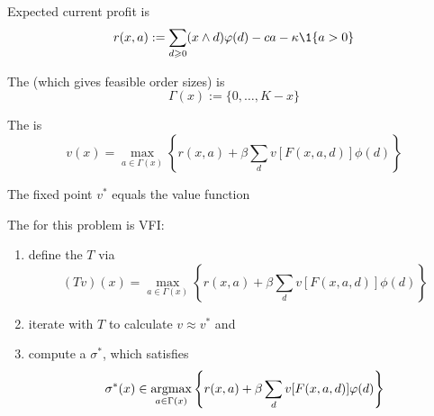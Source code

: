 \begin{frame}
    
    Expected current profit is
    \begin{equation*}
        r(x, a)  := \sum_{d \geq 0} (x \wedge d) \phi(d) 
            - c a - \kappa \1\{a > 0\}
    \end{equation*}

    \vspace{0.5em}
    \vspace{0.5em}
    The  (which gives feasible order sizes) is
    \begin{equation*}
        \Gamma(x) := \{0, \ldots, K - x\}
    \end{equation*}

    \vspace{0.5em}
    The  is
    \begin{equation*}
        v(x)
        = \max_{a \in \Gamma(x)} 
        \left\{
            r(x, a)
            + \beta
            \sum_d v[F(x, a, d)] \phi(d)
        \right\}
    \end{equation*}

    The fixed point $v^*$ equals the value function

\end{frame}

\begin{frame}
    
    The  for this problem is VFI:

    \vspace{0.5em}
    \vspace{0.5em}
    \begin{enumerate}
        \item define the  $T$ via
            \begin{equation*}
                (Tv)(x)
                = \max_{a \in \Gamma(x)} 
                \left\{
                    r(x, a)
                    + \beta
                    \sum_d v[F(x,a,d)] \phi(d)
                \right\}
            \end{equation*}
            \vspace{0.5em}
        \item iterate with $T$ to calculate $v \approx v^*$ and
            \vspace{0.5em}
            \vspace{0.5em}
            \vspace{0.5em}
        \item compute a  $\sigma^*$, which satisfies
            \begin{equation*}
                \sigma^*(x)
                \in \argmax_{a \in \Gamma(x)} 
                \left\{
                    r(x, a)
                    + \beta
                    \sum_d  v[F(x,a,d)] \phi(d)
                \right\}
            \end{equation*}
    \end{enumerate}

\end{frame}


